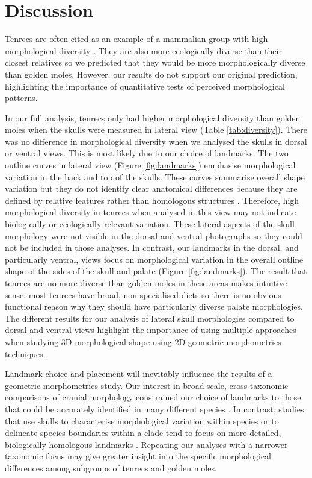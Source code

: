 \documentclass[12pt,a4paper]{article}
\begin{document}
\section{Discussion}

	Tenrecs are often cited as an example of a mammalian group with high morphological diversity \citep{Olson2013, Soarimalala2011, Eisenberg1969}. They are also more ecologically diverse than their closest relatives \citep{Soarimalala2011, Bronner1995} so we predicted that they would be more morphologically diverse than golden moles. However, our results do not support our original prediction, highlighting the importance of quantitative tests of perceived morphological patterns.

	In our full analysis, tenrecs only had higher morphological diversity than golden moles when the skulls were measured in lateral view (Table \ref{tab:diversity}). There was no difference in morphological diversity when we analysed the skulls in dorsal or ventral views. This is most likely due to our choice of landmarks. The two outline curves in lateral view (Figure \ref{fig:landmarks}) emphasise morphological variation in the back and top of the skulls. These curves summarise overall shape variation but they do not identify clear anatomical differences because they are defined by relative features rather than homologous structures \citep{Zelditch2012}. Therefore, high morphological diversity in tenrecs when analysed in this view may not indicate biologically or ecologically relevant variation.	
	These lateral aspects of the skull morphology were not visible in the dorsal and ventral photographs so they could not be included in those analyses. In contrast, our landmarks in the dorsal, and particularly ventral, views focus on morphological variation in the overall outline shape of the sides of the skull and palate (Figure \ref{fig:landmarks}). The result that tenrecs are no more diverse than golden moles in these areas makes intuitive sense: most tenrecs have broad, non-specialised diets \citep{Olson2013} so there is no obvious functional reason why they should have particularly diverse palate morphologies. The different results for our analysis of lateral skull morphologies compared to dorsal and ventral views highlight the importance of using multiple approaches when studying 3D morphological shape using 2D geometric morphometrics techniques \citep{Arnqvist1998}.
    
    Landmark choice and placement will inevitably influence the results of a geometric morphometrics study. Our interest in broad-scale, cross-taxonomic comparisons of cranial morphology constrained our choice of landmarks to those that could be accurately identified in many different species \citep[e.g.][]{Ruta2013, Goswami2011, Wroe2007}. In contrast, studies that use skulls to characterise morphological variation within species \citep[e.g.][]{Blagojevic2011, Bornholdt2008} or to delineate species boundaries within a clade \citep[e.g.][]{Panchetti2008} tend to focus on more detailed, biologically homologous landmarks \citep{Zelditch2012}. Repeating our analyses with a narrower taxonomic focus may give greater insight into the specific morphological differences among subgroups of tenrecs and golden moles.
	
\end{document}
